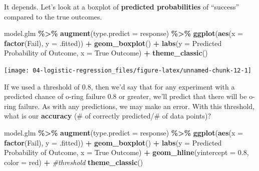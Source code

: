 \documentclass[
]{book}
\newenvironment{Shaded}{\begin{snugshade}}{\end{snugshade}}
\newcommand{\AttributeTok}[1]{\textcolor[rgb]{0.13,0.29,0.53}{#1}}
\newcommand{\CommentTok}[1]{\textcolor[rgb]{0.56,0.35,0.01}{\textit{#1}}}
\newcommand{\FloatTok}[1]{\textcolor[rgb]{0.00,0.00,0.81}{#1}}
\newcommand{\FunctionTok}[1]{\textcolor[rgb]{0.13,0.29,0.53}{\textbf{#1}}}
\newcommand{\NormalTok}[1]{#1}
\newcommand{\SpecialCharTok}[1]{\textcolor[rgb]{0.81,0.36,0.00}{\textbf{#1}}}
\newcommand{\StringTok}[1]{\textcolor[rgb]{0.31,0.60,0.02}{#1}}
\begin{document}
It depends. Let's look at a boxplot of \textbf{predicted probabilities} of ``success'' compared to the true outcomes.

\begin{Shaded}
\begin{Highlighting}[]
\NormalTok{model.glm }\SpecialCharTok{\%\textgreater{}\%}
  \FunctionTok{augment}\NormalTok{(}\AttributeTok{type.predict =} \StringTok{\textquotesingle{}response\textquotesingle{}}\NormalTok{) }\SpecialCharTok{\%\textgreater{}\%}
  \FunctionTok{ggplot}\NormalTok{(}\FunctionTok{aes}\NormalTok{(}\AttributeTok{x =} \FunctionTok{factor}\NormalTok{(Fail), }\AttributeTok{y =}\NormalTok{ .fitted)) }\SpecialCharTok{+} 
  \FunctionTok{geom\_boxplot}\NormalTok{() }\SpecialCharTok{+}
  \FunctionTok{labs}\NormalTok{(}\AttributeTok{y =} \StringTok{\textquotesingle{}Predicted Probability of Outcome\textquotesingle{}}\NormalTok{, }\AttributeTok{x =} \StringTok{\textquotesingle{}True Outcome\textquotesingle{}}\NormalTok{) }\SpecialCharTok{+}
  \FunctionTok{theme\_classic}\NormalTok{()}
\end{Highlighting}
\end{Shaded}

\begin{center}\texttt{[image: 04-logistic-regression\_files/figure-latex/unnamed-chunk-12-1]} \end{center}

If we used a threshold of 0.8, then we'd say that for any experiment with a predicted chance of o-ring failure 0.8 or greater, we'll predict that there will be o-ring failure. As with any predictions, we may make an error. With this threshold, what is our \textbf{accuracy} (\# of correctly predicted/\# of data points)?

\begin{Shaded}
\begin{Highlighting}[]
\NormalTok{model.glm }\SpecialCharTok{\%\textgreater{}\%}
  \FunctionTok{augment}\NormalTok{(}\AttributeTok{type.predict =} \StringTok{\textquotesingle{}response\textquotesingle{}}\NormalTok{) }\SpecialCharTok{\%\textgreater{}\%}
  \FunctionTok{ggplot}\NormalTok{(}\FunctionTok{aes}\NormalTok{(}\AttributeTok{x =} \FunctionTok{factor}\NormalTok{(Fail), }\AttributeTok{y =}\NormalTok{ .fitted)) }\SpecialCharTok{+} 
  \FunctionTok{geom\_boxplot}\NormalTok{() }\SpecialCharTok{+}
  \FunctionTok{labs}\NormalTok{(}\AttributeTok{y =} \StringTok{\textquotesingle{}Predicted Probability of Outcome\textquotesingle{}}\NormalTok{, }\AttributeTok{x =} \StringTok{\textquotesingle{}True Outcome\textquotesingle{}}\NormalTok{) }\SpecialCharTok{+}
  \FunctionTok{geom\_hline}\NormalTok{(}\AttributeTok{yintercept =} \FloatTok{0.8}\NormalTok{, }\AttributeTok{color =} \StringTok{\textquotesingle{}red\textquotesingle{}}\NormalTok{) }\SpecialCharTok{+} \CommentTok{\#threshold}
  \FunctionTok{theme\_classic}\NormalTok{()}
\end{Highlighting}
\end{Shaded}
\end{document}
